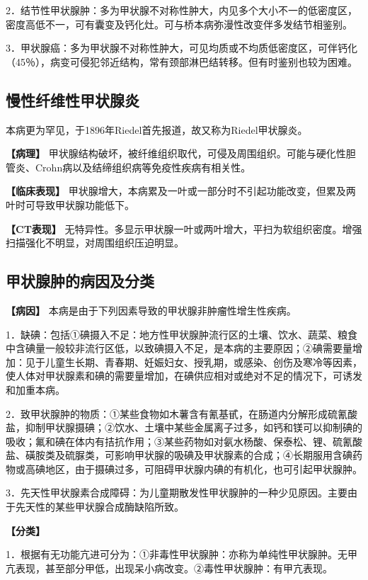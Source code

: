 2．结节性甲状腺肿：多为甲状腺不对称性肿大，内见多个大小不一的低密度区，密度高低不一，可有囊变及钙化灶。可与桥本病弥漫性改变伴多发结节相鉴别。

3．甲状腺癌：多为甲状腺不对称性肿大，可见均质或不均质低密度区，可伴钙化（45％），病变可侵犯邻近结构，常有颈部淋巴结转移。但有时鉴别也较为困难。

\subsection{慢性纤维性甲状腺炎}

本病更为罕见，于1896年Riedel首先报道，故又称为Riedel甲状腺炎。

\textbf{【病理】}
甲状腺结构破坏，被纤维组织取代，可侵及周围组织。可能与硬化性胆管炎、Crohn病以及结缔组织病等免疫性疾病有相关性。

\textbf{【临床表现】}
甲状腺增大，本病累及一叶或一部分时不引起功能改变，但累及两叶时可导致甲状腺功能低下。

\textbf{【CT表现】}
无特异性。多显示甲状腺一叶或两叶增大，平扫为软组织密度。增强扫描强化不明显，对周围组织压迫明显。

\subsection{甲状腺肿的病因及分类}

\textbf{【病因】} 本病是由于下列因素导致的甲状腺非肿瘤性增生性疾病。

1．缺碘：包括①碘摄入不足：地方性甲状腺肿流行区的土壤、饮水、蔬菜、粮食中含碘量一般较非流行区低，以致碘摄入不足，是本病的主要原因；②碘需要量增加：见于儿童生长期、青春期、妊娠妇女、授乳期，或感染、创伤及寒冷等因素，使人体对甲状腺素和碘的需要量增加，在碘供应相对或绝对不足的情况下，可诱发和加重本病。

2．致甲状腺肿的物质：①某些食物如木薯含有氰基甙，在肠道内分解形成硫氰酸盐，抑制甲状腺摄碘；②饮水、土壤中某些金属离子过多，如钙和镁可以抑制碘的吸收；氟和碘在体内有拮抗作用；③某些药物如对氨水杨酸、保泰松、锂、硫氰酸盐、磺胺类及硫脲类，可影响甲状腺的吸碘及甲状腺素的合成；④长期服用含碘药物或高碘地区，由于摄碘过多，可阻碍甲状腺内碘的有机化，也可引起甲状腺肿。

3．先天性甲状腺素合成障碍：为儿童期散发性甲状腺肿的一种少见原因。主要由于先天性的某些甲状腺合成酶缺陷所致。

\textbf{【分类】}

1．根据有无功能亢进可分为：①非毒性甲状腺肿：亦称为单纯性甲状腺肿。无甲亢表现，甚至部分甲低，出现呆小病改变。②毒性甲状腺肿：有甲亢表现。

